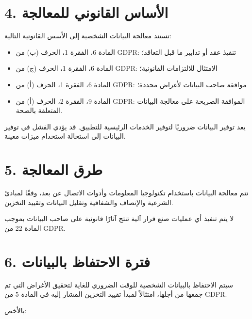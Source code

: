\documentclass[a4paper,12pt]{article}
\begin{document}
    \section*{4. الأساس القانوني للمعالجة}

    تستند معالجة البيانات الشخصية إلى الأسس القانونية التالية:

    \begin{itemize}
        \item المادة 6، الفقرة 1، الحرف (ب) من GDPR: تنفيذ عقد أو تدابير ما قبل التعاقد؛
        \item المادة 6، الفقرة 1، الحرف (ج) من GDPR: الامتثال للالتزامات القانونية؛
        \item المادة 6، الفقرة 1، الحرف (أ) من GDPR: موافقة صاحب البيانات لأغراض محددة؛
        \item المادة 9، الفقرة 2، الحرف (أ) من GDPR: الموافقة الصريحة على معالجة البيانات المتعلقة بالصحة.
    \end{itemize}

    يعد توفير البيانات ضروريًا لتوفير الخدمات الرئيسية للتطبيق. قد يؤدي الفشل في توفير البيانات إلى استحالة استخدام ميزات معينة.

    \section*{5. طرق المعالجة}

    تتم معالجة البيانات باستخدام تكنولوجيا المعلومات وأدوات الاتصال عن بعد، وفقًا لمبادئ الشرعية والإنصاف والشفافية وتقليل البيانات وتقييد التخزين.

    لا يتم تنفيذ أي عمليات صنع قرار آلية تنتج آثارًا قانونية على صاحب البيانات بموجب المادة 22 من GDPR.

    \section*{6. فترة الاحتفاظ بالبيانات}

    سيتم الاحتفاظ بالبيانات الشخصية للوقت الضروري للغاية لتحقيق الأغراض التي تم جمعها من أجلها، امتثالاً لمبدأ تقييد التخزين المشار إليه في المادة 5 من GDPR.

    بالأخص:
\end{document}
